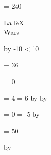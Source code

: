\documentclass{article}
\begin{document}
  \newcount \fonts
  \fonts = 240
  \loop
    \BgThispage

    \fontsize{\the\fonts}{\the\fonts}
    \selectfont
    \vspace*{\fill}
    \begin{center}
      \LaTeX\\ 
      Wars
    \end{center}
    \vspace*{\fill}
    \newpage
    \advance \fonts by -10
  \unless \ifnum \fonts < 10
  \repeat


  \timeback = 36

  \newcount \timeforw
  \timeforw = 0

  \loop
    \BgThispage
    \vspace*{\fill}

    \newcount\tmp
    \tmp = 4
    \newcount \tmpp
    \tmpp = 6
    \multiply \tmp by \timeback
    \multiply \tmpp by \timeback

    \newcount \bb
    \bb = 0
    \newcount \diff
    \diff = -5
    \multiply \diff by \the\timeforw \relax
    
    \newcount \size
    \size = 50

    \advance \size by \the\diff \relax
    
\end{document}
